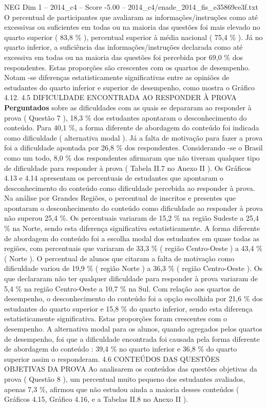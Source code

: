\begin{textsample}{NEG Dim 1 – 2014\_c4 – Score -5.00 – 2014\_c4/enade\_2014\_fis\_e35869ce3f.txt}
O percentual de participantes que avaliaram as informações/instruções como até excessivas ou suficientes em todas ou na maioria das questões foi mais elevado no quarto superior ( 83,8 \% ), percentual superior à média nacional ( 75,4 \% ).
Já no quarto inferior, a suficiência das informações/instruções declarada como até excessiva em todas ou na maioria das questões foi percebida por 69,0 \% dos respondentes.
Estas proporções são crescentes com os quartos de desempenho.
Notam -se diferenças estatisticamente significativas entre as opiniões de estudantes do quarto inferior e superior de desempenho, como mostra o Gráfico 4.12. 4.5 DIFICULDADE ENCONTRADA AO RESPONDER À PROVA \textbf{Perguntados} sobre as dificuldades com as quais se depararam ao responder à prova ( Questão 7 ), 18,3 \% dos estudantes apontaram o desconhecimento do conteúdo.
Para 40,1 \%, a forma diferente de abordagem do conteúdo foi indicada como dificuldade ( alternativa modal ).
Já a falta de motivação para fazer a prova foi a dificuldade apontada por 26,8 \% dos respondentes.
Considerando -se o Brasil como um todo, 8,0 \% dos respondentes afirmaram que não tiveram qualquer tipo de dificuldade para responder à prova ( Tabela II.7 no Anexo II ).
Os Gráficos 4.13 e 4.14 apresentam os percentuais de estudantes que apontaram o desconhecimento do conteúdo como dificuldade percebida ao responder à prova.
Na análise por Grandes Regiões, o percentual de inscritos e presentes que apontaram o desconhecimento do conteúdo como dificuldade ao responder à prova não superou 25,4 \%.
Os percentuais variaram de 15,2 \% na região Sudeste a 25,4 \% na Norte, sendo esta diferença significativa estatisticamente.
A forma diferente de abordagem do conteúdo foi a escolha modal dos estudantes em quase todas as regiões, com percentuais que variaram de 33,3 \% ( região Centro-Oeste ) a 43,4 \% ( Norte ).
O percentual de alunos que citaram a falta de motivação como dificuldade variou de 19,9 \% ( região Norte ) a 36,3 \% ( região Centro-Oeste ).
Os que declararam não ter qualquer dificuldade para responder à prova variaram de 5,4 \% na região Centro-Oeste a 10,7 \% na Sul.
Com relação aos quartos de desempenho, o desconhecimento do conteúdo foi a opção escolhida por 21,6 \% dos estudantes do quarto superior e 15,8 \% do quarto inferior, sendo esta diferença estatisticamente significativa.
Estas proporções foram crescentes com o desempenho.
A alternativa modal para os alunos, quando agregados pelos quartos de desempenho, foi que a dificuldade encontrada foi causada pela forma diferente de abordagem do conteúdo : 39,4 \% no quarto inferior e 36,8 \% do quarto superior assim o responderam. 4.6 CONTEÚDOS DAS QUESTÕES OBJETIVAS DA PROVA Ao analisarem os conteúdos das questões objetivas da prova ( Questão 8 ), um percentual muito pequeno dos estudantes avaliados, apenas 7,3 \%, afirmou que não estudou ainda a maioria desses conteúdos ( Gráficos 4.15, Gráfico 4.16, e a Tabelas II.8 no Anexo II ).

\end{textsample}
